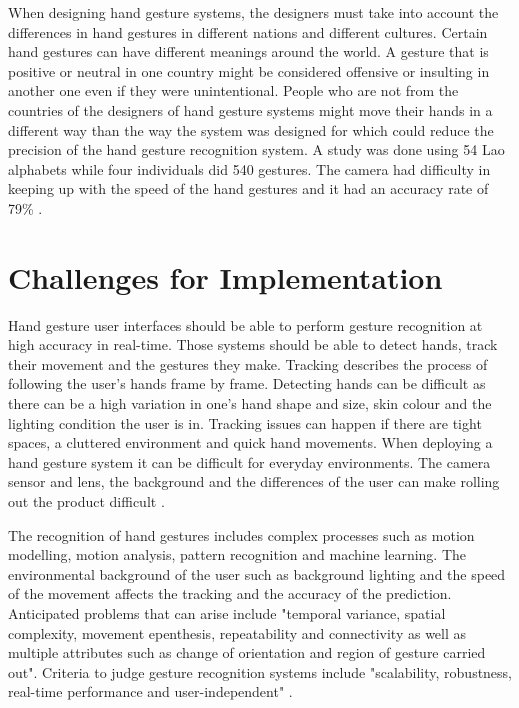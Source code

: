 \documentclass{article}
\begin{document}
When designing hand gesture systems, the designers must take into account the differences in hand gestures in different nations and different cultures. Certain hand gestures can have different meanings around the world. A gesture that is positive or neutral in one country might be considered offensive or insulting in another one even if they were unintentional. People who are not from the countries of the designers of hand gesture systems might move their hands in a different way than the way the system was designed for which could reduce the precision of the hand gesture recognition system. A study was done using 54 Lao alphabets while four individuals did 540 gestures. The camera had difficulty in keeping up with the speed of the hand gestures and it had an accuracy rate of 79\% \cite{shanthakumar2020design}.

\section*{Challenges for Implementation}
Hand gesture user interfaces should be able to perform gesture recognition at high accuracy in real-time. Those systems should be able to detect hands, track their movement and the gestures they make. Tracking describes the process of following the user's hands frame by frame. Detecting hands can be difficult as there can be a high variation in one's hand shape and size, skin colour and the lighting condition the user is in. Tracking issues can happen if there are tight spaces, a cluttered environment and quick hand movements. When deploying a hand gesture system it can be difficult for everyday environments. The camera sensor and lens, the background and the differences of the user can make rolling out the product difficult \cite{10.1145/1897816.1897838}.

The recognition of hand gestures includes complex processes such as motion modelling, motion analysis, pattern recognition and machine learning. The environmental background of the user such as background lighting and the speed of the movement affects the tracking and the accuracy of the prediction. Anticipated problems that can arise include "temporal variance, spatial complexity, movement epenthesis, repeatability and connectivity as well as multiple attributes such as change of orientation and region of gesture carried out". Criteria to judge gesture recognition systems include "scalability, robustness, real-time performance and user-independent" \cite{cheok2019review}.
\end{document}
